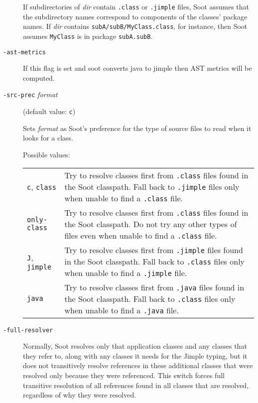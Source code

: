 \documentclass{article}
\begin{document}
\begin{description}
If subdirectories of {\it dir} contain {\tt .class} or
{\tt .jimple} files, Soot assumes that the subdirectory names
correspond to components of the classes' package names. If
{\it dir} contains {\tt subA/subB/MyClass.class}, for
instance, then Soot assumes {\tt MyClass} is in package
{\tt subA.subB}.



  \item[
  {\tt -ast-metrics}]

			If this flag is set and soot converts java to jimple then AST metrics will be computed.
	


  \item[
  {\tt -src-prec}{ \it format}]

(default value: {\tt c})

Sets {\it format} as Soot's preference for the type of source files to read when
it looks for a class.




Possible values:\\
\begin{longtable}{p{1in}p{4in}}
{\tt c}, {\tt class} 
&

Try to resolve classes first from {\tt .class} files found in
the Soot classpath.  Fall back to {\tt .jimple} files
only when unable to find a {\tt .class} file.
\\
{\tt only-class} 
&

Try to resolve classes first from {\tt .class} files found in
the Soot classpath.  Do not try any other types of files even when
unable to find a {\tt .class} file.
\\
{\tt J}, {\tt jimple} 
&

Try to resolve classes first from {\tt .jimple} files found in
the Soot classpath.  Fall back to {\tt .class} files only when
unable to find a {\tt .jimple} file.
\\
{\tt java} 
&

Try to resolve classes first from {\tt .java} files found in
the Soot classpath.  Fall back to {\tt .class} files only when
unable to find a {\tt .java} file.
\\

\end{longtable}


  \item[
  {\tt -full-resolver}]

Normally, Soot resolves only that application classes and any classes that they
refer to, along with any classes it needs for the Jimple typing, but it does not
transitively resolve references in these additional classes that were resolved
only because they were referenced. This switch forces full transitive resolution
of all references found in all classes that are resolved, regardless of why they
were resolved.


\end{description}
\end{document}
